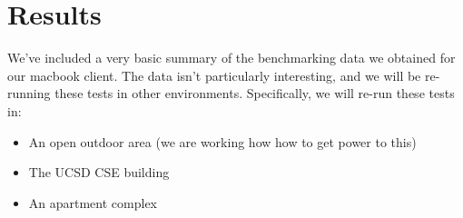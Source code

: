 \section{Results}
We've included a very basic summary of the benchmarking data we
obtained for our macbook client. The data isn't particularly
interesting, and we will be re-running these tests in other
environments. Specifically, we will re-run these tests in:
\begin{itemize}
\item An open outdoor area (we are working how how to get power to this)
\item The UCSD CSE building
\item An apartment complex
\end{itemize}
